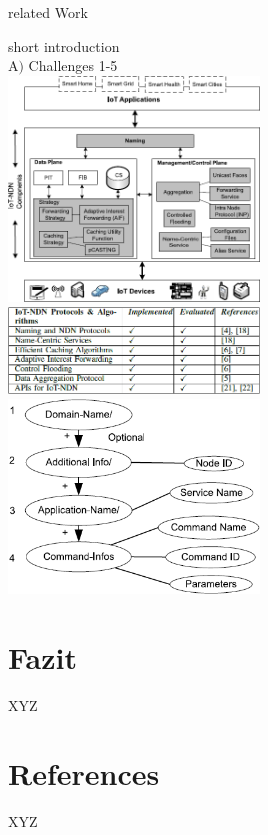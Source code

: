 \documentclass[a4paper,12pt]{article}
\begin{document}
\begin{itemize}
\begin{itemize}
\end{itemize}

related Work

short introduction\\

A$)$ Challenges 1-5\\





\includegraphics[width=0.5\textwidth]{IoT-NDN_System_architecture_and_its_components.png}\\
\includegraphics[width=0.5\textwidth]{IMPLEMENTED_AND_TESTED_PROTOCOLS_AND_ALGORITHMS_IN_IOT-NDN.png}\\
\includegraphics[width=0.5\textwidth]{Name_Structure_of_the_suggested_Approach.png}\\
\section{Fazit}
XYZ
\section{References}
XYZ
\end{document}
